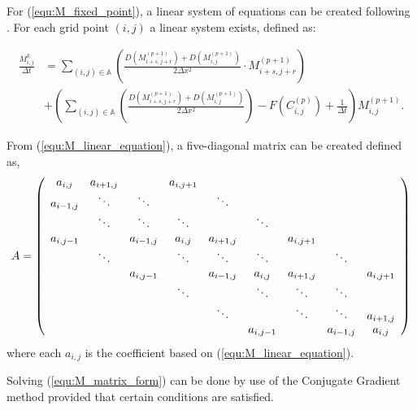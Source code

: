 For (\ref{equ:M_fixed_point}), a linear system of equations can be created following \cite{saad2003iterativeMethod}.
For each grid point $(i,j)$ a linear system exists, defined as:

\begin{equation} \label{equ:M_linear_equation}
\begin{aligned}
  \frac{M^{k}_{i,j}}{\Delta t} &= 
  \sum_{(i,j) \in \mathbb{A}} \left( \frac{D(M^{(p+1)}_{i+s,j+r}) + D(M^{(p+1)}_{i,j})} 
    {2\Delta x^2} \cdot M^{(p+1)}_{i+s, j+r} \right) \\
  & +\left( \sum_{(i,j) \in \mathbb{A}} \left( \frac{ D(M^{(p+1)}_{i+s,j+r}) + D(M^{(p+1)}_{i,j})} 
    {2\Delta x^2} \right) - F(C^{(p)}_{i,j}) + \frac{1}{\Delta t} \right) M^{(p+1)}_{i,j}.
\end{aligned}
\end{equation} 

From (\ref{equ:M_linear_equation}), a five-diagonal matrix can be created defined as,
\begin{equation} \label{equ:M_matrix_form}
  A = 
    \left( 
      \begin{array}{c c c c c c c c c c}
        a_{i,j} & a_{i+1,j} &  & a_{i,j+1} &   \\
        a_{i-1,j} & \ddots & \ddots &   &  \ddots &   \\
        & \ddots & \ddots & \ddots & & \ddots & \\
        a_{i,j-1} &  & a_{i-1,j} & a_{i,j} & a_{i+1,j} &   &  a_{i,j+1} &   \\
        & \ddots & & \ddots & \ddots & \ddots & & \ddots\\
        & & a_{i,j-1} &  & a_{i-1,j} & a_{i,j} & a_{i+1,j} &  & a_{i,j+1} \\
        & & & \ddots & & \ddots & \ddots & \ddots & \\
        & & & & \ddots & & \ddots & \ddots & a_{i+1,j} \\
        & & & & & a_{i,j-1} & & a_{i-1,j} & a_{i,j}
      \end{array}
    \right)
\end{equation}
where each $a_{i,j}$ is the coefficient based on (\ref{equ:M_linear_equation}). 

Solving (\ref{equ:M_matrix_form}) can be done by use of the Conjugate Gradient method provided that certain conditions are satisfied.

